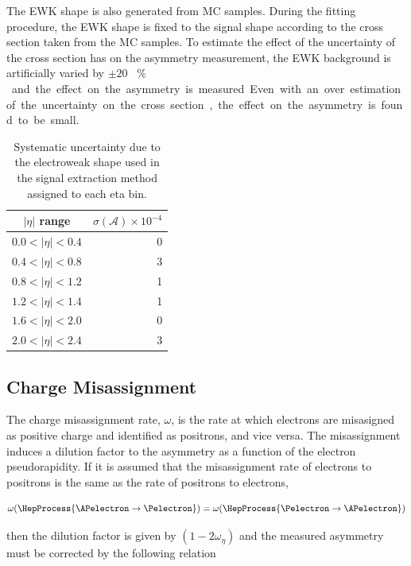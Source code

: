 The \ac{EWK} shape is also generated from \ac{MC} samples. During the fitting
procedure, the \ac{EWK} shape is fixed to the \Wenu signal shape according to
the cross section taken from the \ac{MC} samples. To estimate the effect of the
uncertainty of the cross section has on the asymmetry measurement, the \ac{EWK}
background is artificially varied by \unit{$\pm20$}{ \% } and the effect on the
asymmetry is measured. Even with an over estimation of the uncertainty on the
cross section, the effect on the asymmetry is found to be small.

\begin{table}[htbp]
\begin{center}
\begin{tabular}{cr}
    \toprule
$|\eta|$ range & $\sigma(\mathcal{A}) \times 10^{-4}$\\
\midrule
$0.0<|\eta|<0.4$ & 0\\
$0.4<|\eta|<0.8$ & 3\\
$0.8<|\eta|<1.2$ & 1\\
$1.2<|\eta|<1.4$ & 1\\
$1.6<|\eta|<2.0$ & 0\\
$2.0<|\eta|<2.4$ & 3\\
    \bottomrule
\end{tabular}
\caption{\label{tab:systEWK}Systematic uncertainty due to the electroweak \ETm shape used in the signal extraction method assigned to each eta bin.}
\end{center}
\end{table}


\subsection{Charge Misassignment}

The charge misassignment rate, $\omega$, is the rate at which electrons are
misasigned as positive charge and identified as positrons, and vice versa. The
misassignment induces a dilution factor to the asymmetry as a function of the
electron pseudorapidity. If it is assumed that the misassignment rate of
electrons to positrons is the same as the rate of positrons to electrons, \ie 

\begin{equation}
  \omega( \HepProcess{\APelectron \to \Pelectron} ) =
  \omega( \HepProcess{\Pelectron \to \APelectron} )
\end{equation}

then the dilution factor is given by $(1-2\omega_\eta)$ and the measured
asymmetry must be corrected by the following relation

